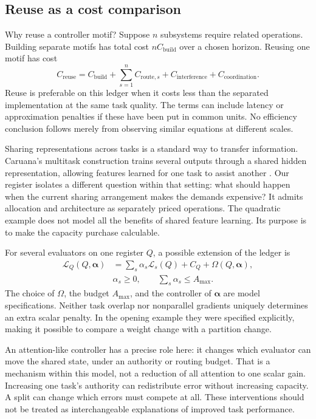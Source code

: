 \subsection{Reuse as a cost comparison}

Why reuse a controller motif? Suppose \(n\) subsystems require related operations. Building separate motifs has total cost \(nC_{\mathrm{build}}\) over a chosen horizon. Reusing one motif has cost
\begin{equation}
 C_{\mathrm{reuse}}=
 C_{\mathrm{build}}+\sum_{s=1}^n C_{\mathrm{route},s}
             +C_{\mathrm{interference}}+C_{\mathrm{coordination}} .
 \label{eq:reuse-ledger}
\end{equation}
Reuse is preferable on this ledger when it costs less than the separated implementation at the same task quality. The terms can include latency or approximation penalties if these have been put in common units. No efficiency conclusion follows merely from observing similar equations at different scales.

Sharing representations across tasks is a standard way to transfer information. Caruana's multitask construction trains several outputs through a shared hidden representation, allowing features learned for one task to assist another \cite{caruana1997multitask}. Our register isolates a different question within that setting: what should happen when the current sharing arrangement makes the demands expensive? It admits allocation and architecture as separately priced operations. The quadratic example does not model all the benefits of shared feature learning. Its purpose is to make the capacity purchase calculable.

For several evaluators on one register \(Q\), a possible extension of the ledger is
\begin{align}
 \mathcal L_Q(Q,\boldsymbol\alpha)
 &=\sum_s\alpha_s\mathcal L_s(Q)+C_Q
                         +\Omega(Q,\boldsymbol\alpha),\nonumber\\
 &\alpha_s\geq0,\qquad\sum_s\alpha_s\leq A_{\max}.
 \label{eq:yba-pcr-shared-loss}
\end{align}
The choice of \(\Omega\), the budget \(A_{\max}\), and the controller of \(\boldsymbol\alpha\) are model specifications. Neither task overlap nor nonparallel gradients uniquely determines an extra scalar penalty. In the opening example they were specified explicitly, making it possible to compare a weight change with a partition change.

An attention-like controller has a precise role here: it changes which evaluator can move the shared state, under an authority or routing budget. That is a mechanism within this model, not a reduction of all attention to one scalar gain. Increasing one task's authority can redistribute error without increasing capacity. A split can change which errors must compete at all. These interventions should not be treated as interchangeable explanations of improved task performance.

